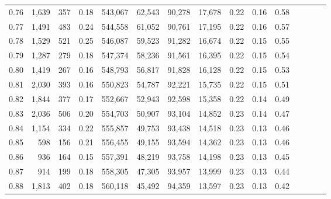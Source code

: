 \begin{tabular}{rrrcrrrrrrrrrrr}
0.76 &   1,639 &     357 &                                       0.18 &  543,067 &   62,543 &   90,278 &  17,678 &  0.22 &  0.16 &                         0.58 \\
0.77 &   1,491 &     483 &                                       0.24 &  544,558 &   61,052 &   90,761 &  17,195 &  0.22 &  0.16 &                         0.57 \\
0.78 &   1,529 &     521 &                                       0.25 &  546,087 &   59,523 &   91,282 &  16,674 &  0.22 &  0.15 &                         0.55 \\
0.79 &   1,287 &     279 &                                       0.18 &  547,374 &   58,236 &   91,561 &  16,395 &  0.22 &  0.15 &                         0.54 \\
0.80 &   1,419 &     267 &                                       0.16 &  548,793 &   56,817 &   91,828 &  16,128 &  0.22 &  0.15 &                         0.53 \\
0.81 &   2,030 &     393 &                                       0.16 &  550,823 &   54,787 &   92,221 &  15,735 &  0.22 &  0.15 &                         0.51 \\
0.82 &   1,844 &     377 &                                       0.17 &  552,667 &   52,943 &   92,598 &  15,358 &  0.22 &  0.14 &                         0.49 \\
0.83 &   2,036 &     506 &                                       0.20 &  554,703 &   50,907 &   93,104 &  14,852 &  0.23 &  0.14 &                         0.47 \\
0.84 &   1,154 &     334 &                                       0.22 &  555,857 &   49,753 &   93,438 &  14,518 &  0.23 &  0.13 &                         0.46 \\
0.85 &     598 &     156 &                                       0.21 &  556,455 &   49,155 &   93,594 &  14,362 &  0.23 &  0.13 &                         0.46 \\
0.86 &     936 &     164 &                                       0.15 &  557,391 &   48,219 &   93,758 &  14,198 &  0.23 &  0.13 &                         0.45 \\
0.87 &     914 &     199 &                                       0.18 &  558,305 &   47,305 &   93,957 &  13,999 &  0.23 &  0.13 &                         0.44 \\
0.88 &   1,813 &     402 &                                       0.18 &  560,118 &   45,492 &   94,359 &  13,597 &  0.23 &  0.13 &                         0.42 \\

\end{tabular}
